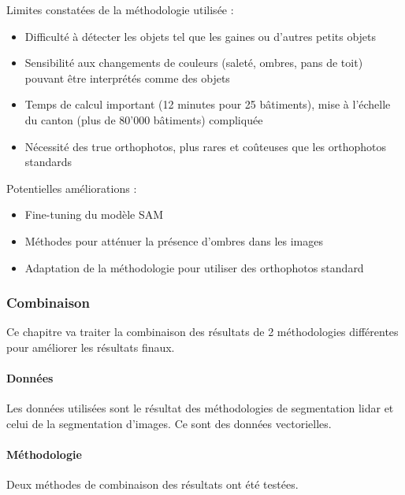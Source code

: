 {{{{\par{Limites constatées de la méthodologie utilisée :}
\begin{itemize}
\item Difficulté à détecter les objets tel que les gaines ou d'autres petits objets
\item Sensibilité aux changements de couleurs (saleté, ombres, pans de toit) pouvant être interprétés comme des objets
\item Temps de calcul important (12 minutes pour 25 bâtiments), mise à l'échelle du canton (plus de 80'000 bâtiments) compliquée
\item Nécessité des true orthophotos, plus rares et coûteuses que les orthophotos standards
\end{itemize}

\par{Potentielles améliorations :}
\begin{itemize}
\item Fine-tuning du modèle SAM
\item Méthodes pour atténuer la présence d'ombres dans les images
\item Adaptation de la méthodologie pour utiliser des orthophotos standard
\end{itemize}

\subsubsection{Combinaison}

\par{Ce chapitre va traiter la combinaison des résultats de 2 méthodologies différentes pour améliorer les résultats finaux.}

\paragraph{Données}

\par{Les données utilisées sont le résultat des méthodologies de segmentation \gls{lidar} et celui de la segmentation d'images. Ce sont des données vectorielles.}

\paragraph{Méthodologie}

\par{Deux méthodes de combinaison des résultats ont été testées.}

}}}}
